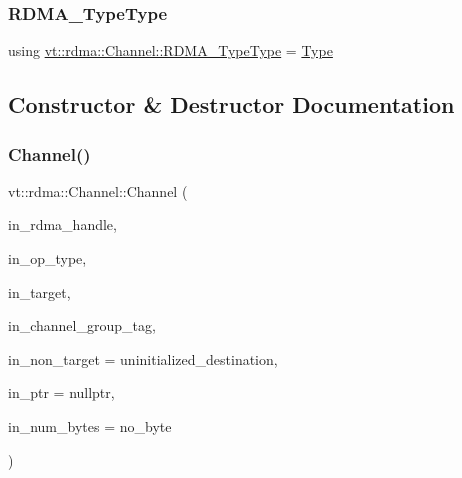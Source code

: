 \mbox{\label{structvt_1_1rdma_1_1_channel_aaf1a80b6dd527e4876de77bcd58a7330}} 
\subsubsection{\texorpdfstring{R\+D\+M\+A\+\_\+\+Type\+Type}{RDMA\_TypeType}}
{\footnotesize\ttfamily using \hyperlink{namespacevt_1_1rdma_ac848e1d9da43db6294bd06f83e5d3946}{vt\+::rdma\+::\+Channel\+::\+R\+D\+M\+A\+\_\+\+Type\+Type} =  \hyperlink{namespacevt_1_1rdma_ac848e1d9da43db6294bd06f83e5d3946}{Type}}



\subsection{Constructor \& Destructor Documentation}
\mbox{\label{structvt_1_1rdma_1_1_channel_ae15a5cd0e393f64192675d5a33796523}} 
\subsubsection{\texorpdfstring{Channel()}{Channel()}}
{\footnotesize\ttfamily vt\+::rdma\+::\+Channel\+::\+Channel (\begin{DoxyParamCaption}\item[{\hyperlink{namespacevt_a10442579ec4e7ebef223818e64bcf908}{R\+D\+M\+A\+\_\+\+Handle\+Type} const \&}]{in\+\_\+rdma\+\_\+handle,  }\item[{\hyperlink{namespacevt_1_1rdma_ac848e1d9da43db6294bd06f83e5d3946}{R\+D\+M\+A\+\_\+\+Type\+Type} const \&}]{in\+\_\+op\+\_\+type,  }\item[{\hyperlink{namespacevt_a866da9d0efc19c0a1ce79e9e492f47e2}{Node\+Type} const \&}]{in\+\_\+target,  }\item[{\hyperlink{namespacevt_a84ab281dae04a52a4b243d6bf62d0e52}{Tag\+Type} const \&}]{in\+\_\+channel\+\_\+group\+\_\+tag,  }\item[{\hyperlink{namespacevt_a866da9d0efc19c0a1ce79e9e492f47e2}{Node\+Type} const \&}]{in\+\_\+non\+\_\+target = {\ttfamily uninitialized\+\_\+destination},  }\item[{\hyperlink{namespacevt_a9e2c953286c7616f7c218e9951790776}{R\+D\+M\+A\+\_\+\+Ptr\+Type} const \&}]{in\+\_\+ptr = {\ttfamily nullptr},  }\item[{\hyperlink{namespacevt_aab8d55968084610ce3b17057981e9300}{Byte\+Type} const \&}]{in\+\_\+num\+\_\+bytes = {\ttfamily no\+\_\+byte} }\end{DoxyParamCaption})}

